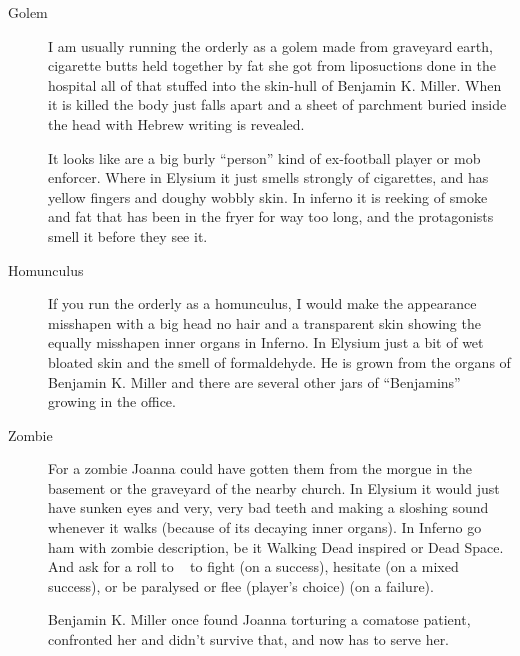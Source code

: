 \begin{description}
  \item[Golem] I am usually running the orderly as a golem made from graveyard earth, cigarette butts held together by fat she got from
    liposuctions done in the hospital all of that stuffed into the skin-hull of Benjamin K. Miller.  When it is killed the body
    just falls apart and a sheet of parchment buried inside the head with Hebrew writing is revealed.

    It looks like are a big burly “person” kind of ex-football player or mob enforcer.  Where in Elysium it just smells strongly of
    cigarettes, and has yellow fingers and doughy wobbly skin.  In inferno it is reeking of smoke and fat that has been in the
    fryer for way too long, and the protagonists smell it before they see it.

  \item[Homunculus] If you run the orderly as a homunculus, I would make the appearance misshapen with a big head no hair and a
    transparent skin showing the equally misshapen inner organs in Inferno.  In Elysium just a bit of wet bloated skin and
    the smell of formaldehyde.  He is grown from the organs of Benjamin K. Miller and there are several other jars of
    “Benjamins” growing in the office.

  \item[Zombie] For a zombie Joanna could have gotten them from the morgue in the basement or the graveyard of the nearby church.
    In Elysium it would just have sunken eyes and very, very bad teeth and making a sloshing sound whenever it walks (because
    of its decaying inner organs).  In Inferno go ham with zombie description, be it Walking Dead inspired or Dead Space.  And
    ask for a roll to ~ to fight (on a success), hesitate (on a mixed success), or be
    paralysed or flee (player's choice) (on a failure).

    Benjamin K. Miller once found Joanna torturing a comatose patient, confronted her and didn't survive that, and now has to serve her.
\end{description}


